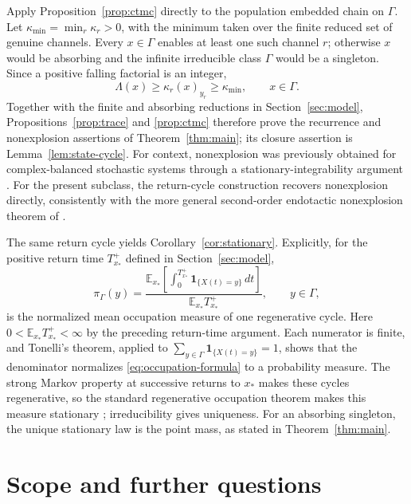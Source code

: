 Apply Proposition~\ref{prop:ctmc} directly to the population embedded chain on
\(\Gamma\).  Let \(\kappa_{\min}=\min_r\kappa_r>0\), with the minimum taken
over the finite reduced set of genuine channels.  Every \(x\in\Gamma\) enables
at least one such channel \(r\); otherwise \(x\) would be absorbing and the
infinite irreducible class \(\Gamma\) would be a singleton.  Since a positive
falling factorial is an integer,
\begin{equation}\label{eq:rate-lower}
  \Lambda(x)\ge\kappa_r(x)_{y_r}\ge\kappa_{\min},
  \qquad x\in\Gamma.
\end{equation}
Together with the finite and absorbing reductions in
Section~\ref{sec:model}, Propositions~\ref{prop:trace} and \ref{prop:ctmc}
therefore prove the recurrence and nonexplosion assertions of
Theorem~\ref{thm:main}; its closure assertion is
Lemma~\ref{lem:state-cycle}.  For context, nonexplosion was previously obtained for
complex-balanced stochastic systems through a stationary-integrability
argument \citep{AndersonCappellettiKoyamaKurtz2018}.  For the present subclass,
the return-cycle construction recovers nonexplosion directly, consistently
with the more general second-order endotactic nonexplosion theorem of
\citet{Xu2026}.

The same return cycle yields Corollary~\ref{cor:stationary}.  Explicitly, for
the positive return time \(T_{x_*}^+\) defined in Section~\ref{sec:model},
\begin{equation}\label{eq:occupation-formula}
 \pi_\Gamma(y)=
 \frac{\displaystyle
   \mathbb E_{x_*}\!\left[\int_0^{T_{x_*}^+}
      \mathbf1_{\{X(t)=y\}}\,dt\right]}
 {\mathbb E_{x_*}T_{x_*}^+},
 \qquad y\in\Gamma,
\end{equation}
is the normalized mean occupation measure of one regenerative cycle.  Here
\(0<\mathbb E_{x_*}T_{x_*}^+<\infty\) by the preceding return-time argument.
Each numerator is finite, and Tonelli's theorem, applied to
\(\sum_{y\in\Gamma}\mathbf1_{\{X(t)=y\}}=1\), shows that the denominator
normalizes \eqref{eq:occupation-formula} to a probability measure.  The strong
Markov property at successive returns to \(x_*\) makes these cycles
regenerative, so the standard regenerative occupation theorem makes this
measure stationary \citep{Asmussen2003}; irreducibility gives uniqueness.  For
an absorbing singleton, the unique stationary law is the point mass, as stated
in Theorem~\ref{thm:main}.

\section{Scope and further questions}\label{sec:scope}

